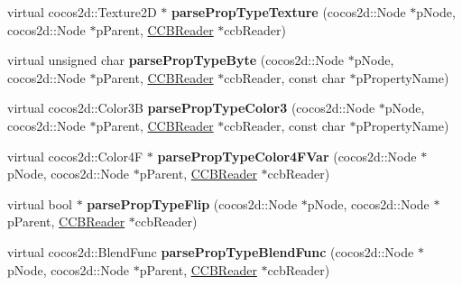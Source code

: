 \begin{DoxyCompactItemize}
\mbox{\label{classcocosbuilder_1_1NodeLoader_a8362280569432b649deb78969a442ee2}} 
virtual cocos2d\+::\+Texture2D $\ast$ {\bfseries parse\+Prop\+Type\+Texture} (cocos2d\+::\+Node $\ast$p\+Node, cocos2d\+::\+Node $\ast$p\+Parent, \hyperlink{classcocosbuilder_1_1CCBReader}{C\+C\+B\+Reader} $\ast$ccb\+Reader)
\item 
\mbox{\label{classcocosbuilder_1_1NodeLoader_aec26550b0ca17a92d46190fc5f9237d5}} 
virtual unsigned char {\bfseries parse\+Prop\+Type\+Byte} (cocos2d\+::\+Node $\ast$p\+Node, cocos2d\+::\+Node $\ast$p\+Parent, \hyperlink{classcocosbuilder_1_1CCBReader}{C\+C\+B\+Reader} $\ast$ccb\+Reader, const char $\ast$p\+Property\+Name)
\item 
\mbox{\label{classcocosbuilder_1_1NodeLoader_a7a4999eb419093eff0fa7c9cc4ec3d9d}} 
virtual cocos2d\+::\+Color3B {\bfseries parse\+Prop\+Type\+Color3} (cocos2d\+::\+Node $\ast$p\+Node, cocos2d\+::\+Node $\ast$p\+Parent, \hyperlink{classcocosbuilder_1_1CCBReader}{C\+C\+B\+Reader} $\ast$ccb\+Reader, const char $\ast$p\+Property\+Name)
\item 
\mbox{\label{classcocosbuilder_1_1NodeLoader_a7dec008e7a703c71b5ca49b53add3662}} 
virtual cocos2d\+::\+Color4F $\ast$ {\bfseries parse\+Prop\+Type\+Color4\+F\+Var} (cocos2d\+::\+Node $\ast$p\+Node, cocos2d\+::\+Node $\ast$p\+Parent, \hyperlink{classcocosbuilder_1_1CCBReader}{C\+C\+B\+Reader} $\ast$ccb\+Reader)
\item 
\mbox{\label{classcocosbuilder_1_1NodeLoader_ae7fa00eee9f58d8870b17c93f9b1fb2b}} 
virtual bool $\ast$ {\bfseries parse\+Prop\+Type\+Flip} (cocos2d\+::\+Node $\ast$p\+Node, cocos2d\+::\+Node $\ast$p\+Parent, \hyperlink{classcocosbuilder_1_1CCBReader}{C\+C\+B\+Reader} $\ast$ccb\+Reader)
\item 
\mbox{\label{classcocosbuilder_1_1NodeLoader_ab67d868ba3fef631352383f1f5aa1fb2}} 
virtual cocos2d\+::\+Blend\+Func {\bfseries parse\+Prop\+Type\+Blend\+Func} (cocos2d\+::\+Node $\ast$p\+Node, cocos2d\+::\+Node $\ast$p\+Parent, \hyperlink{classcocosbuilder_1_1CCBReader}{C\+C\+B\+Reader} $\ast$ccb\+Reader)
\item 

\end{DoxyCompactItemize}
